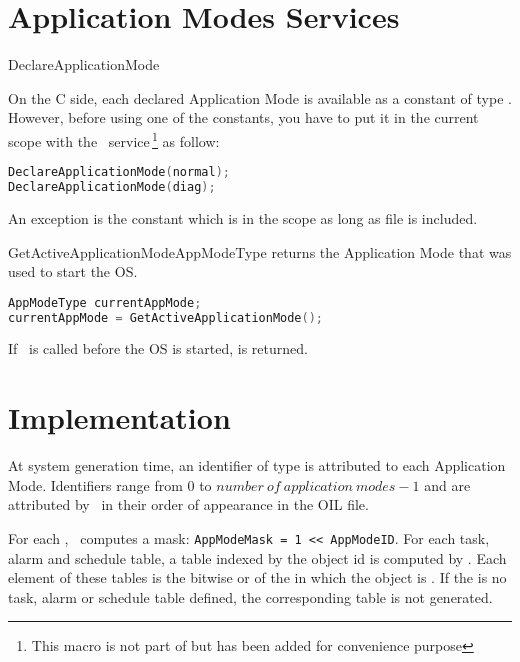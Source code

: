 \section{Application Modes Services}

\begin{service}{DeclareApplicationMode}{}

On the C side, each declared Application Mode is available as a constant of type . However, before using one of the constants, you have to put it in the current scope with the \servicename\ service\,\footnote{This macro is not part of \cite{OSEKOS223} but has been added for convenience purpose}  as follow:

\begin{lstlisting}[language=C]
DeclareApplicationMode(normal);
DeclareApplicationMode(diag);
\end{lstlisting}

An exception is the constant  which is in the scope as long as file  is included.

\end{service}

\begin{service}{GetActiveApplicationMode}{AppModeType}
 returns the Application Mode that was used to start the OS.
\begin{lstlisting}[language=C]
AppModeType currentAppMode;
currentAppMode = GetActiveApplicationMode();
\end{lstlisting}
If \apiname\ is called before the OS is started,  is returned.

\end{service}

\section{Implementation}

At system generation time, an identifier  of type  is attributed to each Application Mode.
Identifiers range from $0$ to $number~of~application~modes - 1$ and are attributed by \goil\ in their order of appearance in the OIL file.

For each , \goil\ computes a mask: \lstinline[language=OIL]{AppModeMask = 1 << AppModeID}.
For each task, alarm and schedule table, a table indexed by the object id is computed by \goil. Each element of these tables is the bitwise or of the  in which the object is . If the is no task, alarm or schedule table defined, the corresponding table is not generated.


